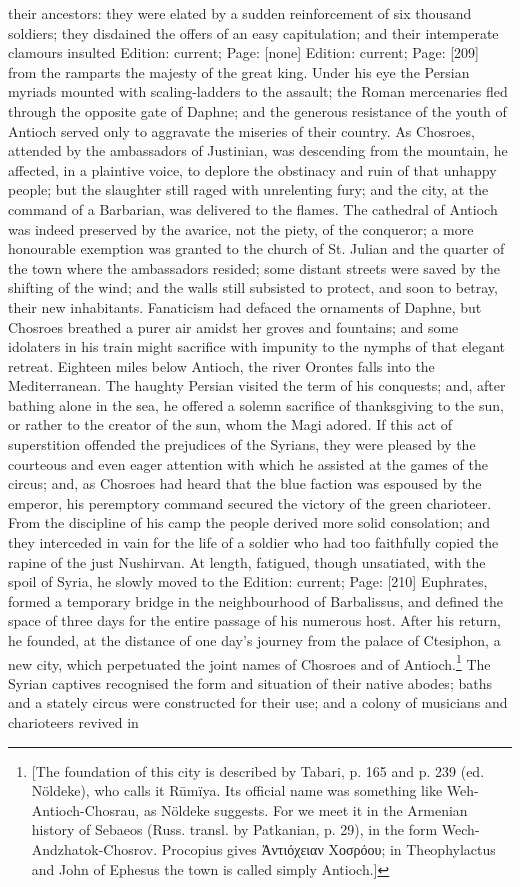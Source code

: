 their ancestors: they were elated by a sudden reinforcement of six thousand soldiers; they disdained the offers of an easy capitulation; and their intemperate clamours insulted Edition: current; Page: [none] Edition: current; Page: [209] from the ramparts the majesty of the great king. Under his eye the Persian myriads mounted with scaling-ladders to the assault; the Roman mercenaries fled through the opposite gate of Daphne; and the generous resistance of the youth of Antioch served only to aggravate the miseries of their country. As Chosroes, attended by the ambassadors of Justinian, was descending from the mountain, he affected, in a plaintive voice, to deplore the obstinacy and ruin of that unhappy people; but the slaughter still raged with unrelenting fury; and the city, at the command of a Barbarian, was delivered to the flames. The cathedral of Antioch was indeed preserved by the avarice, not the piety, of the conqueror; a more honourable exemption was granted to the church of St. Julian and the quarter of the town where the ambassadors resided; some distant streets were saved by the shifting of the wind; and the walls still subsisted to protect, and soon to betray, their new inhabitants. Fanaticism had defaced the ornaments of Daphne, but Chosroes breathed a purer air amidst her groves and fountains; and some idolaters in his train might sacrifice with impunity to the nymphs of that elegant retreat. Eighteen miles below Antioch, the river Orontes falls into the Mediterranean. The haughty Persian visited the term of his conquests; and, after bathing alone in the sea, he offered a solemn sacrifice of thanksgiving to the sun, or rather to the creator of the sun, whom the Magi adored. If this act of superstition offended the prejudices of the Syrians, they were pleased by the courteous and even eager attention with which he assisted at the games of the circus; and, as Chosroes had heard that the blue faction was espoused by the emperor, his peremptory command secured the victory of the green charioteer. From the discipline of his camp the people derived more solid consolation; and they interceded in vain for the life of a soldier who had too faithfully copied the rapine of the just Nushirvan. At length, fatigued, though unsatiated, with the spoil of Syria, he slowly moved to the Edition: current; Page: [210] Euphrates, formed a temporary bridge in the neighbourhood of Barbalissus, and defined the space of three days for the entire passage of his numerous host. After his return, he founded, at the distance of one day\texthebrew{}’s journey from the palace of Ctesiphon, a new city, which perpetuated the joint names of Chosroes and of Antioch.\footnote{[The foundation of this city is described by Tabari, p. 165 and p. 239 (ed. Nöldeke), who calls it Rūmïya. Its official name was something like Weh-Antioch-Chosrau, as Nöldeke suggests. For we meet it in the Armenian history of Sebaeos (Russ. transl. by Patkanian, p. 29), in the form Wech-Andzhatok-Chosrov. Procopius gives \textgreek{\texthebrew{Ἀ}ντιόχειαν Χοσρόου}; in Theophylactus and John of Ephesus the town is called simply Antioch.]} The Syrian captives recognised the form and situation of their native abodes; baths and a stately circus were constructed for their use; and a colony of musicians and charioteers revived in 